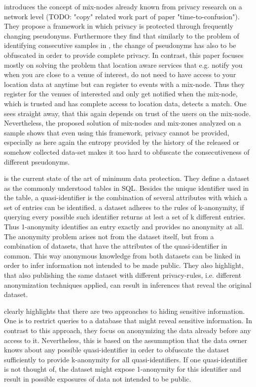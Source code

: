 \parencite{location-privacy} introduces the concept of mix-nodes already known from privacy research on a network level (TODO: "copy" related work part of paper "time-to-confusion"). They propose a framework in which privacy is protected through frequently changing pseudonyms. Furthermore they find that similarly to the problem of identifying consecutive samples in \parencite{time-to-confusion}, the change of pseudonyms has also to be obfuscated in order to provide complete privacy. In contrast, this paper focuses mostly on solving the problem that location aware services that e.g. notify you when you are close to a venue of interest, do not need to have access to your location data at anytime but can register to events with a mix-node. Thus they register for the venues of interested and only get notified when the mix-node, which is trusted and has complete access to location data, detects a match. One sees straight away, that this again depends on trust of the users on the mix-node. Nevertheless, the proposed solution of mix-nodes and mix-zones analyzed on a sample shows that even using this framework, privacy cannot be provided, especially as here again the entropy provided by the history of the released or somehow collected data-set makes it too hard to obfuscate the consecutiveness of different pseudonyms.

\parencite{k-anonymity} is the current state of the art of minimum data protection. They define a dataset as the commonly understood tables in SQL. Besides the unique identifier used in the table, a quasi-identifier is the combination of several attributes with which a set of entries can be identified. a dataset adheres to the rules of k-anonymity, if querying every possible such identifier returns at lest a set of k different entries. Thus 1-anonymity identifies an entry exactly and provides no anonymity at all. The anonymity problem arises not from the dataset itself, but from a combination of datasets, that have the attributes of the quasi-identifier in common. This way anonymous knowledge from both datasets can be linked in order to infer information not intended to be made public. They also highlight, that also publishing the same dataset with different privacy-rules, i.e. different anonymization techniques applied, can result in inferences that reveal the original dataset.

\parencite{k-anonymity} clearly highlights that there are two approaches to hiding sensitive information. One is to restrict queries to a database that might reveal sensitive information. In contrast to this approach, they focus on anonymizing the data already before any access to it. Nevertheless, this is based on the assummption that the data owner knows about any possible quasi-identifier in order to obfuscate the dataset sufficiently to provide k-anonymity for all quasi-identifiers. If one quasi-identifier is not thought of, the dataset might expose 1-anonymity for this identifier and result in possible exposures of data not intended to be public.

